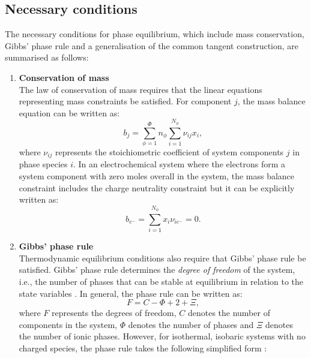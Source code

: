\subsection{Necessary conditions}
  The necessary conditions for phase equilibrium, which include mass conservation, Gibbs' phase rule and a generalisation of the common tangent construction, are summarised as follows:
	\begin{enumerate}\compresslist
		\item \textbf{Conservation of mass}\\
			The law of conservation of mass requires that the linear equations representing mass constraints be satisfied. For component $j$, the mass balance equation can be written as:
			\begin{equation}\label{eq:massbalance}
				b_j = \sum_{\phi=1}^{\Phi} n_{\phi}\sum_{i=1}^{N_{\phi}} {\nu}_{ij} x_{i},
			\end{equation}
			where ${\nu}_{ij}$ represents the stoichiometric coefficient of system components $j$ in phase species $i$. In an electrochemical system where the electrons form a system component with zero moles overall in the system, the mass balance constraint includes the charge neutrality constraint but it can be explicitly written as:
			\begin{equation}\label{eq:chargebalance}
				b_{e^-} = \sum_{i=1}^{N_{\phi}}x_{i}{\nu}_{i{e^-}} = 0.
			\end{equation} 		
		\item \textbf{Gibbs' phase rule}\\
			Thermodynamic equilibrium conditions also require that  Gibbs' phase rule be satisfied. Gibbs' phase rule determines the \emph{degree of freedom} of the system, i.e., the number of phases that can be stable at equilibrium in relation to the state variables \cite{Gibbs:1878aa}. In general, the phase rule can be written as:
			\begin{equation}
                			F=C-\Phi + 2 + \Xi,
            		\end{equation}
            		where $F$ represents the degrees of freedom, $C$ denotes the number of components in the system, $\Phi$ denotes the number of phases and $\Xi$ denotes the number of ionic phases. However, for isothermal, isobaric systems with no charged species, the phase rule takes the following simplified form :

\end{enumerate}
